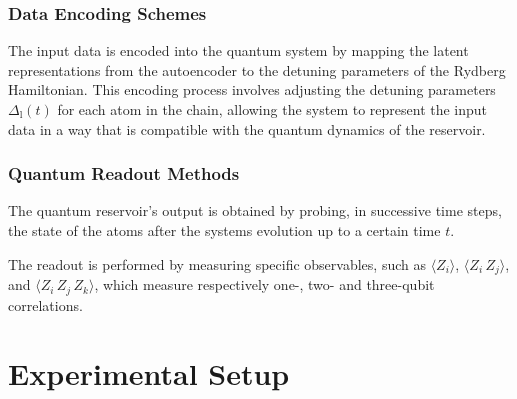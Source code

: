 \documentclass[conference]{IEEEtran}
\begin{document}
\subsubsection{Data Encoding Schemes}
The input data is encoded into the quantum system by mapping
the latent representations from the autoencoder to the
detuning parameters of the Rydberg Hamiltonian.
This encoding process involves adjusting the detuning
parameters \( \Delta_{\mathrm{l}}(t) \) for each atom in the chain,
allowing the system to represent the input data in a way that
is compatible with the quantum dynamics of the reservoir.

\subsubsection{Quantum Readout Methods}
The quantum reservoir's output is obtained by probing, 
in successive time steps, the state of the atoms 
after the systems evolution up to a certain time \( t \).

The readout is performed by measuring specific observables,
such as $\langle Z_i \rangle$, $\langle Z_i \, Z_j\rangle$, and $\langle Z_i \, Z_j \, Z_k \rangle$, which measure respectively one-, two- and three-qubit correlations.

\section{Experimental Setup}
\end{document}
